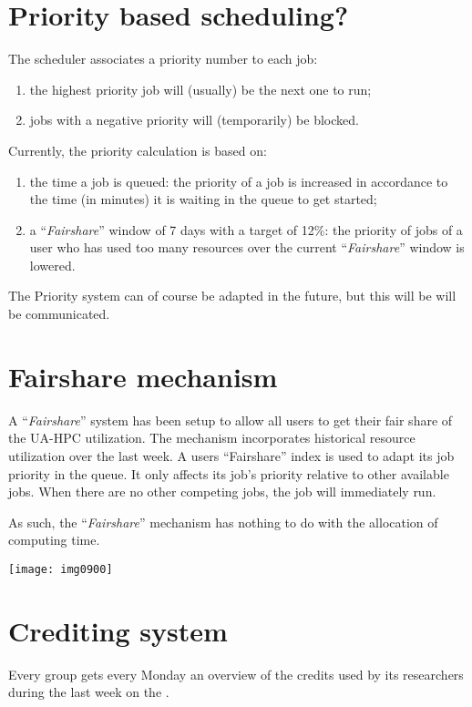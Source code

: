 \section{Priority based scheduling?}

The scheduler associates a priority number to each job:

\begin{enumerate}
\item  the highest priority job will (usually) be the next one to run;
\item  jobs with a negative priority will (temporarily) be blocked.
\end{enumerate}

Currently, the priority calculation is based on:

\begin{enumerate}
\item  the time a job is queued: the priority of a job is increased in accordance to the time (in minutes) it is waiting in the queue to get started;
\item  a ``\emph{Fairshare}'' window of 7 days with a target of 12\%: the priority of jobs of a user who has used too many resources over the current ``\emph{Fairshare}'' window is lowered.
\end{enumerate}

The Priority system can of course be adapted in the future, but this will be will be communicated.


\section{Fairshare mechanism}

A ``\emph{Fairshare}'' system has been setup to allow all users to get their
fair share of the UA-HPC utilization.  The mechanism incorporates historical
resource utilization over the last week.  A users ``Fairshare'' index is used
to adapt its job priority in the queue.  It only affects its job's priority
relative to other available jobs. When there are no other competing jobs, the
job will immediately run.

As such, the ``\emph{Fairshare}'' mechanism has nothing to do with the
allocation of computing time.

\texttt{[image: img0900]}


\section{Crediting system}

Every group gets every Monday an overview of the credits used by its researchers during the last week on the \hpc.

